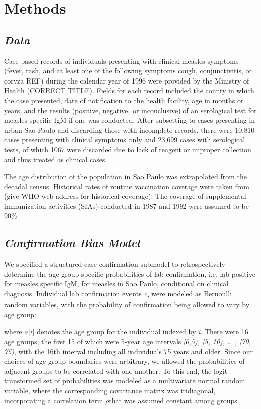 \section{\texorpdfstring{\textbf{Methods}}{Methods}}\label{methods}

\subsection{\texorpdfstring{\emph{Data}}{Data}}\label{data}

Case-based records of individuals presenting with clinical measles
symptoms (fever, rash, and at least one of the following symptoms cough,
conjunctivitis, or coryza REF) during the calendar year of 1996 were
provided by the Ministry of Health (CORRECT TITLE). Fields for each
record included the county in which the case presented, date of
notification to the health facility, age in months or years, and the
results (positive, negative, or inconclusive) of an serological test for
measles specific IgM if one was conducted. After subsetting to cases
presenting in urban Sao Paulo and discarding those with incomplete
records, there were 10,810 cases presenting with clinical symptoms only
and 23,699 cases with serological tests, of which 1067 were discarded
due to lack of reagent or improper collection and thus treated as
clinical cases.

The age distribution of the population in Sao Paulo was extrapolated
from the decadal census. Historical rates of routine vaccination
coverage were taken from (give WHO web address for historical coverage).
The coverage of supplemental immunization activities (SIAs) conducted in
1987 and 1992 were assumed to be 90\%.

\subsection{\texorpdfstring{\emph{Confirmation Bias
Model}}{Confirmation Bias Model}}\label{confirmation-bias-model}

We specified a structured case confirmation submodel to retrospectively
determine the age group-specific probabilities of lab confirmation, i.e.
lab positive for measles specific IgM, for measles in Sao Paulo,
conditional on clinical diagnosis. Individual lab confirmation events
\emph{c\textsubscript{i}} were modeled as Bernoulli random variables,
with the probability of confirmation being allowed to vary by age group:


where \(a\lbrack i\rbrack\) denotes the age group for the individual
indexed by \emph{i}. There were 16 age groups, the first 15 of which
were 5-year age intervals \emph{{[}0,5), {[}5, 10), \ldots{} , {[}70,
75)}, with the 16th interval including all individuals 75 years and
older. Since our choices of age group boundaries were arbitrary, we
allowed the probabilities of adjacent groups to be correlated with one
another. To this end, the logit-transformed set of probabilities was
modeled as a multivariate normal random variable, where the
corresponding covariance matrix was tridiagonal, incorporating a
correlation term \(\rho\)that was assumed constant among groups.